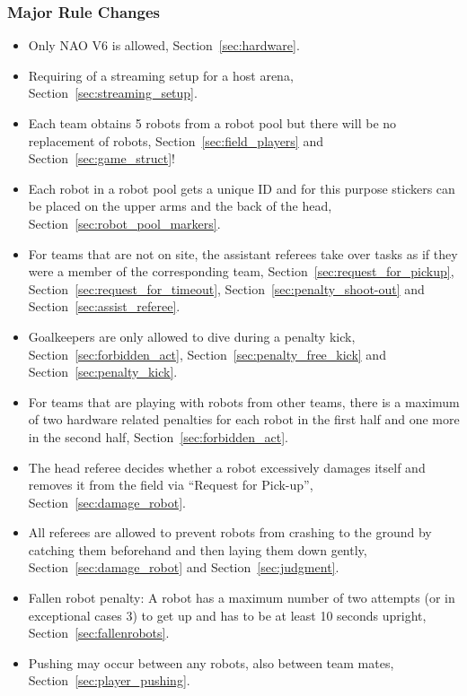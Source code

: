 \subsubsection{Major Rule Changes}
\label{sec:major_rule_changes}
\begin{itemize}
\item Only NAO V6 is allowed, \cf Section~\ref{sec:hardware}.
\item Requiring of a streaming setup for a host arena, \cf Section~\ref{sec:streaming_setup}.
\item Each team obtains 5 robots from a robot pool but there will be no replacement of robots, \cf Section~\ref{sec:field_players} and Section~\ref{sec:game_struct}! 
\item Each robot in a robot pool gets a unique ID and for this purpose stickers can be placed on the upper arms and the back of the head, \cf Section~\ref{sec:robot_pool_markers}.
\item For teams that are not on site, the assistant referees take over tasks as if they were a member of the corresponding team, \cf Section~\ref{sec:request_for_pickup}, Section~\ref{sec:request_for_timeout}, Section~\ref{sec:penalty_shoot-out} and Section~\ref{sec:assist_referee}.
\item Goalkeepers are only allowed to dive during a penalty kick, \cf Section~\ref{sec:forbidden_act}, Section~\ref{sec:penalty_free_kick} and Section~\ref{sec:penalty_kick}. 
\item For teams that are playing with robots from other teams, there is a maximum of two hardware related penalties for each robot in the first half and one more in the second half, \cf Section~\ref{sec:forbidden_act}. 
\item The head referee decides whether a robot excessively damages itself and removes it from the field via ``Request for Pick-up'', \cf Section~\ref{sec:damage_robot}.
\item All referees are allowed to prevent robots from crashing to the ground by catching them beforehand and then laying them down gently, \cf Section~\ref{sec:damage_robot} and Section~\ref{sec:judgment}. 
\item Fallen robot penalty: A robot has a maximum number of two attempts (or in exceptional cases 3) to get up and has to be at least 10 seconds upright, \cf Section~\ref{sec:fallenrobots}.
\item Pushing may occur between any robots, \ie also between team mates, \cf Section~\ref{sec:player_pushing}. 
\end{itemize}